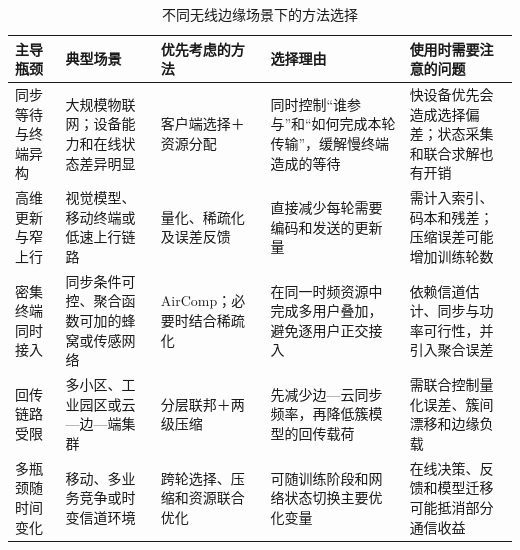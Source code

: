 \begin{table}[t]
  \centering
  \caption{不同无线边缘场景下的方法选择}
  \label{tab:scenario-selection}
  \begin{threeparttable}
    \small
    \setlength{\tabcolsep}{4pt}
    \renewcommand{\arraystretch}{1.28}
    \begin{tabularx}{\textwidth}{
      @{}>{\centering\arraybackslash}p{2.05cm}
      >{\raggedright\arraybackslash}p{2.45cm}
      >{\centering\arraybackslash}p{2.65cm}
      >{\raggedright\arraybackslash}X
      >{\raggedright\arraybackslash}X@{}}
      \toprule
      主导瓶颈 & 典型场景 & 优先考虑的方法 & 选择理由 & 使用时需要注意的问题 \\
      \midrule
      同步等待与终端异构
        & 大规模物联网；设备能力和在线状态差异明显
        & 客户端选择＋资源分配
        & 同时控制“谁参与”和“如何完成本轮传输”，缓解慢终端造成的等待
        & 快设备优先会造成选择偏差；状态采集和联合求解也有开销\cite{Xu2021ClientBandwidth,Nishio2019FedCS} \\
      高维更新与窄上行
        & 视觉模型、移动终端或低速上行链路
        & 量化、稀疏化及误差反馈
        & 直接减少每轮需要编码和发送的更新量
        & 需计入索引、码本和残差；压缩误差可能增加训练轮数\cite{Reisizadeh2020FedPAQ,Sattler2020STC} \\
      密集终端同时接入
        & 同步条件可控、聚合函数可加的蜂窝或传感网络
        & AirComp；必要时结合稀疏化
        & 在同一时频资源中完成多用户叠加，避免逐用户正交接入
        & 依赖信道估计、同步与功率可行性，并引入聚合误差\cite{Zhu2020BroadbandAnalog,Oh2024SparseOneBitOTA} \\
      回传链路受限
        & 多小区、工业园区或云—边—端集群
        & 分层联邦＋两级压缩
        & 先减少边—云同步频率，再降低簇模型的回传载荷
        & 需联合控制量化误差、簇间漂移和边缘负载\cite{Liu2023HierarchicalQuantization,Zhong2022HierarchicalHeterogeneous} \\
      多瓶颈随时间变化
        & 移动、多业务竞争或时变信道环境
        & 跨轮选择、压缩和资源联合优化
        & 可随训练阶段和网络状态切换主要优化变量
        & 在线决策、反馈和模型迁移可能抵消部分通信收益\cite{Xu2021ClientBandwidth,Marnissi2024AdaptiveSQ,Azimi2024HierarchicalOTA} \\
      \bottomrule
    \end{tabularx}
  \end{threeparttable}
\end{table}
